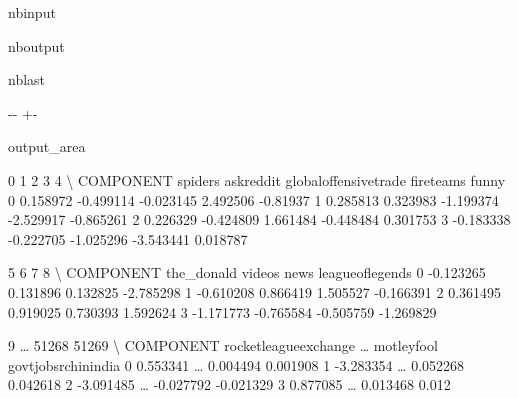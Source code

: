 \documentclass[letterpaper,10pt,english]{sphinxhowto}
\begin{document}
\begin{sphinxuseclass}{nbinput}
{
\begin{sphinxVerbatim}[commandchars=\\\{\}]
\llap{\color{nbsphinxin}[3]:\,\hspace{\fboxrule}\hspace{\fboxsep}}
\end{sphinxVerbatim}
}

\end{sphinxuseclass}
\begin{sphinxuseclass}{nboutput}
\begin{sphinxuseclass}{nblast}
{

\kern-\sphinxverbatimsmallskipamount\kern-\baselineskip
\kern+\FrameHeightAdjust\kern-\fboxrule
\vspace{\nbsphinxcodecellspacing}

\begin{sphinxuseclass}{output_area}
\begin{sphinxuseclass}{}


\begin{sphinxVerbatim}[commandchars=\\\{\}]
\llap{\color{nbsphinxout}[3]:\,\hspace{\fboxrule}\hspace{\fboxsep}}              0          1                     2          3         4      \textbackslash{}
COMPONENT   spiders  askreddit  globaloffensivetrade  fireteams     funny
0          0.158972  -0.499114             -0.023145   2.492506  -0.81937
1          0.285813   0.323983             -1.199374  -2.529917 -0.865261
2          0.226329  -0.424809              1.661484  -0.448484  0.301753
3         -0.183338  -0.222705             -1.025296  -3.543441  0.018787

                5         6         7                8      \textbackslash{}
COMPONENT  the\_donald    videos      news  leagueoflegends
0           -0.123265  0.131896  0.132825        -2.785298
1           -0.610208  0.866419  1.505527        -0.166391
2            0.361495  0.919025  0.730393         1.592624
3           -1.171773 -0.765584 -0.505759        -1.269829

                          9      {\ldots}       51268               51269  \textbackslash{}
COMPONENT  rocketleagueexchange  {\ldots}  motleyfool  govtjobsrchinindia
0                      0.553341  {\ldots}    0.004494            0.001908
1                     -3.283354  {\ldots}    0.052268            0.042618
2                     -3.091485  {\ldots}   -0.027792           -0.021329
3                      0.877085  {\ldots}    0.013468               0.012


\end{sphinxVerbatim}
\end{sphinxuseclass}
\end{sphinxuseclass}}
\end{sphinxuseclass}
\end{sphinxuseclass}
\end{document}
